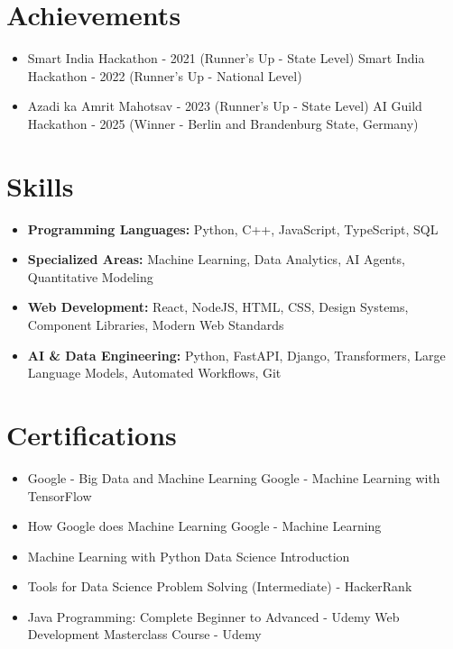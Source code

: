 \documentclass[a4paper,10pt]{article}
\begin{document}
\section*{Achievements}
\begin{itemize}
\item Smart India Hackathon - 2021 (Runner's Up - State Level) \hfill Smart India Hackathon - 2022 (Runner's Up - National Level)
\item Azadi ka Amrit Mahotsav - 2023 (Runner's Up - State Level) \hfill AI Guild Hackathon - 2025 (Winner - Berlin and Brandenburg State, Germany)
\end{itemize}

\section*{Skills}
\begin{itemize}
  \item \textbf{Programming Languages:} Python, C++, JavaScript, TypeScript, SQL
  \item \textbf{Specialized Areas:} Machine Learning, Data Analytics, AI Agents, Quantitative Modeling
  \item \textbf{Web Development:} React, NodeJS, HTML, CSS, Design Systems, Component Libraries, Modern Web Standards
  \item \textbf{AI \& Data Engineering:} Python, FastAPI, Django, Transformers, Large Language Models, Automated Workflows, Git
\end{itemize}

\section*{Certifications}
\begin{itemize}
\item Google - Big Data and Machine Learning \hfill Google - Machine Learning with TensorFlow
\item How Google does Machine Learning \hfill Google - Machine Learning
\item Machine Learning with Python \hfill Data Science Introduction
\item Tools for Data Science \hfill Problem Solving (Intermediate) - HackerRank
\item Java Programming: Complete Beginner to Advanced - Udemy \hfill Web Development Masterclass Course - Udemy
\end{itemize}
\end{document}
